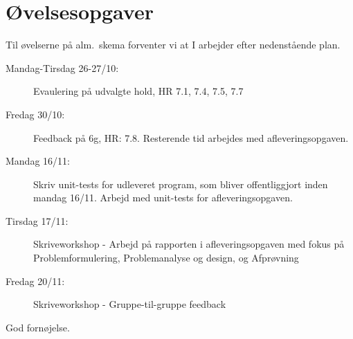 \documentclass[a4paper,12pt]{article}
\begin{document}
\section*{Øvelsesopgaver}
Til øvelserne på alm.\ skema forventer vi at I arbejder efter nedenstående plan.
\begin{description}
\item[Mandag-Tirsdag 26-27/10:] Evaulering på udvalgte hold, HR 7.1, 7.4, 7.5, 7.7 
\item[Fredag 30/10:] Feedback på 6g, HR: 7.8. Resterende tid arbejdes med afleveringsopgaven.
\item[Mandag 16/11:] Skriv unit-tests for udleveret program, som bliver offentliggjort inden mandag 16/11. Arbejd med unit-tests for afleveringsopgaven.
\item[Tirsdag 17/11:] Skriveworkshop - Arbejd på rapporten i afleveringsopgaven med fokus på Problemformulering, Problemanalyse og design, og Afprøvning
\item[Fredag 20/11:] Skriveworkshop - Gruppe-til-gruppe feedback
\end{description}

\flushright God fornøjelse.
\end{document}
